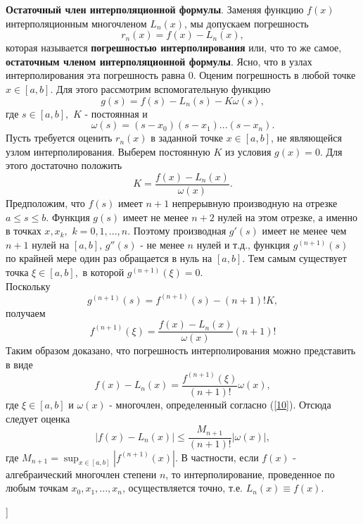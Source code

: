 \textbf{Остаточный член интерполяционной формулы}. Заменяя функцию $f(x)$ интерполяционным многочленом $L_n(x)$, мы допускаем погрешность 
\begin{equation*}
    r_n(x) = f(x) - L_n(x),
\end{equation*}
которая называется \textbf{погрешностью интерполирования} или, что то же самое, \textbf{остаточным членом интерполяционной формулы}. Ясно, что в узлах интерполирования эта погрешность равна 0. Оценим погрешность в любой точке $x \in [a,b]$. Для этого рассмотрим вспомогательную функцию
\begin{equation} \label{9}
    g(s) = f(s) - L_n(s) - K\omega(s), 
\end{equation}
где $s \in [a,b],$ $K$ - постоянная и 
\begin{equation} \label{10}
    \omega(s) = (s-x_0)(s-x_1)...(s-x_n).
\end{equation}
Пусть требуется оценить $r_n(x)$ в заданной точке $x \in [a,b]$, не являющейся узлом интерполирования. Выберем постоянную $K$ из условия $g(x)=0.$ Для этого достаточно положить
\begin{equation*}
    K = \frac{f(x)-L_n(x)}{\omega(x)}.
\end{equation*}
Предположим, что $f(s)$ имеет $n+1$ непрерывную производную на отрезке $a \leq s \leq b.$ Функция $g(s)$ имеет не менее $n+2$ нулей на этом отрезке, а именно в точках $x, x_k,$ $k=0,1,...,n$. Поэтому производная $g'(s)$ имеет не менее чем $n+1$ нулей на $[a,b]$, $g''(s)$ - не менее $n$ нулей и т.д., функция $g^{(n+1)}(s)$ по крайней мере один раз обращается в нуль на $[a,b].$ Тем самым существует точка $\xi \in [a,b], $ в которой $g^{(n+1)}(\xi)=0$. \\
Поскольку 
\begin{equation*}
    g^{(n+1)}(s) = f^{(n+1)}(s)-(n+1)!K,
\end{equation*}
получаем
\begin{equation*}
    f^{(n+1)}(\xi) = \frac{f(x)-L_n(x)}{\omega (x)} (n+1)!
\end{equation*}
Таким образом доказано, что погрешность интерполирования можно представить в виде
\begin{equation}
    f(x)-L_n(x) = \frac{f^{(n+1)}(\xi)}{(n+1)!}\omega(x),
\end{equation}
где $\xi \in [a,b]$ и $\omega(x)$ - многочлен, определенный согласно (\ref{10}).
Отсюда следует оценка 
\begin{equation*}
    |f(x)-L_n(x)| \leq \frac{M_{n+1}}{(n+1)!} |\omega(x)|,
\end{equation*}
где $M_{n+1} = \sup_{x \in [a,b]}|f^{(n+1)}(x)|.$ В частности, если $f(x)$ - алгебраический многочлен степени $n$, то интерполирование, проведенное по любым точкам $x_0, x_1, ..., x_n$, осуществляется точно, т.е. $L_n(x) \equiv f(x).$ 

\bigbreak
[\cite[page 127-129, 132-133]{Samarski}]